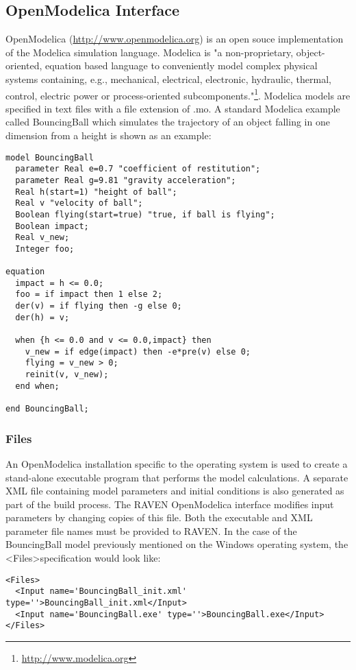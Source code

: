 \subsection{OpenModelica Interface}
OpenModelica (\url{http://www.openmodelica.org}) is an open souce implementation of the Modelica simulation language.  Modelica is "a non-proprietary,
object-oriented, equation based language to conveniently model complex physical systems containing, e.g., mechanical, electrical, electronic, hydraulic,
thermal, control, electric power or process-oriented subcomponents."\footnote{\url{http://www.modelica.org}}.  Modelica models are specified in text files
with a file extension of .mo.  A standard Modelica example called BouncingBall which simulates the trajectory of an object falling in one dimension from a
height is shown as an example:
\begin{lstlisting}
model BouncingBall
  parameter Real e=0.7 "coefficient of restitution";
  parameter Real g=9.81 "gravity acceleration";
  Real h(start=1) "height of ball";
  Real v "velocity of ball";
  Boolean flying(start=true) "true, if ball is flying";
  Boolean impact;
  Real v_new;
  Integer foo;

equation
  impact = h <= 0.0;
  foo = if impact then 1 else 2;
  der(v) = if flying then -g else 0;
  der(h) = v;

  when {h <= 0.0 and v <= 0.0,impact} then
    v_new = if edge(impact) then -e*pre(v) else 0;
    flying = v_new > 0;
    reinit(v, v_new);
  end when;

end BouncingBall;
\end{lstlisting}

\subsubsection{Files}
An OpenModelica installation specific to the operating system is used to create a stand-alone executable program that performs the model calculations.
A separate XML file containing model parameters and initial conditions is also generated as part of the build process.  The RAVEN OpenModelica interface
modifies input parameters by changing copies of this file.  Both the executable and XML parameter file names must be provided to RAVEN.  In the case of
the BouncingBall model previously mentioned on the Windows operating system, the \textless Files\textgreater  specification would look like:
\begin{lstlisting}[style=XML]
<Files>
  <Input name='BouncingBall_init.xml' type=''>BouncingBall_init.xml</Input>
  <Input name='BouncingBall.exe' type=''>BouncingBall.exe</Input>
</Files>
\end{lstlisting}

